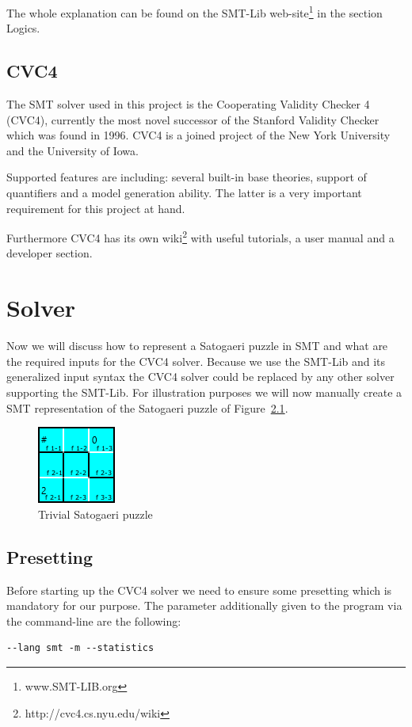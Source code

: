 The whole explanation can be found on the SMT-Lib web-site\footnote{www.SMT-LIB.org} in the section Logics.

\section{CVC4}
The SMT solver used in this project is the Cooperating Validity Checker 4 (CVC4), currently the most novel  successor of the Stanford Validity Checker which was found in 1996. CVC4 is a joined project of the New York University and the University of Iowa.

Supported features are including: several built-in base theories, support of quantifiers and a model generation ability. The latter is a very important requirement for this project at hand.

Furthermore CVC4 has its own wiki\footnote{http://cvc4.cs.nyu.edu/wiki} with useful tutorials, a user manual and a developer section.

\chapter{Solver} \label{The Solver}
Now we will discuss how to represent a Satogaeri puzzle in SMT and what are the required inputs for the CVC4 solver. Because we use the SMT-Lib and its generalized input syntax the CVC4 solver could be replaced by any other solver supporting the SMT-Lib. For illustration purposes we will now manually create a SMT representation of the Satogaeri puzzle of Figure~\ref{fig:solver_example}.
\begin{figure}
  \centering
  \includegraphics[scale=1]{Pictures/Solver_example.png} 
  \caption{Trivial Satogaeri puzzle}
  \label{fig:solver_example}
\end{figure}

\section{Presetting}
Before starting up the CVC4 solver we need to ensure some presetting which is mandatory for our purpose.
The parameter additionally given to the program via the command-line are the following:
\begin{lstlisting}
--lang smt -m --statistics
\end{lstlisting}

